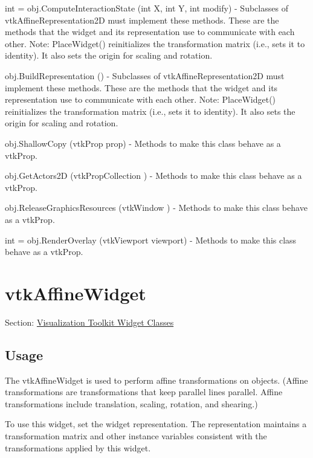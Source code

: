 \begin{DoxyItemize}
\item {\ttfamily int = obj.\-Compute\-Interaction\-State (int X, int Y, int modify)} -\/ Subclasses of vtk\-Affine\-Representation2\-D must implement these methods. These are the methods that the widget and its representation use to communicate with each other. Note\-: Place\-Widget() reinitializes the transformation matrix (i.\-e., sets it to identity). It also sets the origin for scaling and rotation.  
\item {\ttfamily obj.\-Build\-Representation ()} -\/ Subclasses of vtk\-Affine\-Representation2\-D must implement these methods. These are the methods that the widget and its representation use to communicate with each other. Note\-: Place\-Widget() reinitializes the transformation matrix (i.\-e., sets it to identity). It also sets the origin for scaling and rotation.  
\item {\ttfamily obj.\-Shallow\-Copy (vtk\-Prop prop)} -\/ Methods to make this class behave as a vtk\-Prop.  
\item {\ttfamily obj.\-Get\-Actors2\-D (vtk\-Prop\-Collection )} -\/ Methods to make this class behave as a vtk\-Prop.  
\item {\ttfamily obj.\-Release\-Graphics\-Resources (vtk\-Window )} -\/ Methods to make this class behave as a vtk\-Prop.  
\item {\ttfamily int = obj.\-Render\-Overlay (vtk\-Viewport viewport)} -\/ Methods to make this class behave as a vtk\-Prop.  
\end{DoxyItemize}\hypertarget{vtkwidgets_vtkaffinewidget}{}\section{vtk\-Affine\-Widget}\label{vtkwidgets_vtkaffinewidget}
Section\-: \hyperlink{sec_vtkwidgets}{Visualization Toolkit Widget Classes} \hypertarget{vtkwidgets_vtkxyplotwidget_Usage}{}\subsection{Usage}\label{vtkwidgets_vtkxyplotwidget_Usage}
The vtk\-Affine\-Widget is used to perform affine transformations on objects. (Affine transformations are transformations that keep parallel lines parallel. Affine transformations include translation, scaling, rotation, and shearing.)

To use this widget, set the widget representation. The representation maintains a transformation matrix and other instance variables consistent with the transformations applied by this widget.

